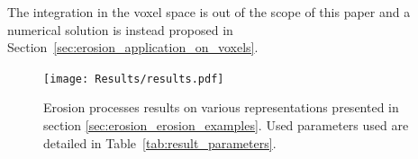 The integration in the voxel space is out of the scope of this paper and a numerical solution is instead proposed in Section~\ref{sec:erosion_application_on_voxels}.


\clearpage
\begin{figure}
	\centering
    \texttt{[image: Results/results.pdf]}
	\caption{Erosion processes results on various representations presented in section \ref{sec:erosion_erosion_examples}. Used parameters used are detailed in  Table~\ref{tab:result_parameters}.}
	\label{tab:result_figures}
\end{figure}
